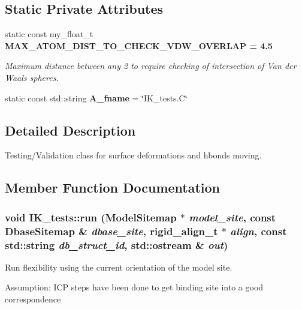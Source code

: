 \subsection*{Static Private Attributes}
\begin{CompactItemize}
\item 
static const my\_\-float\_\-t \bf{MAX\_\-ATOM\_\-DIST\_\-TO\_\-CHECK\_\-VDW\_\-OVERLAP} = 4.5\label{classSimSite3D_1_1IK__tests_229bfd4bf67a0a8a73322015a0307c22}

\begin{CompactList}\small\item\em Maximum distance between any 2 to require checking of intersection of Van der Waals spheres. \item\end{CompactList}\item 
static const std::string \textbf{A\_\-fname} = \char`\"{}IK\_\-tests.C\char`\"{}\label{classSimSite3D_1_1IK__tests_2f41807950842f871a832e69ae666921}

\end{CompactItemize}


\subsection{Detailed Description}
Testing/Validation class for surface deformations and hbonds moving. 



\subsection{Member Function Documentation}
\subsubsection{\setlength{\rightskip}{0pt plus 5cm}void IK\_\-tests::run (\bf{Model\-Sitemap} $\ast$ {\em model\_\-site}, const \bf{Dbase\-Sitemap} \& {\em dbase\_\-site}, \bf{rigid\_\-align\_\-t} $\ast$ {\em align}, const std::string {\em db\_\-struct\_\-id}, std::ostream \& {\em out})}\label{classSimSite3D_1_1IK__tests_fac5e4fb00a62ec37cc72f53ebb20cfd}


Run flexibility using the current orientation of the model site. 

Assumption: ICP steps have been done to get binding site into a good correspondence 

